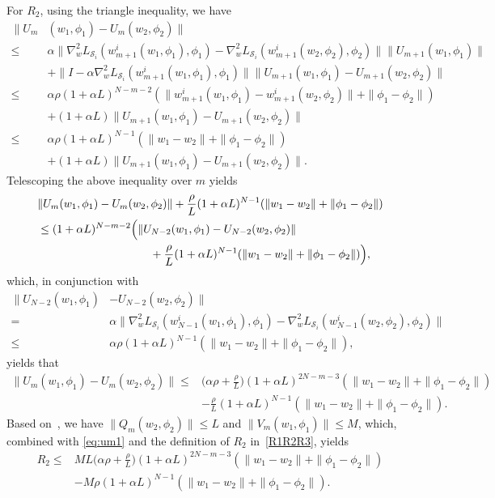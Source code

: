 \documentclass{osudissert96}
\begin{document}
 For $R_2$, using the triangle inequality, we have
\begin{align}\label{eq:impor}
\|U_m&(w_1,\phi_1)-U_m(w_2,\phi_2)\|  \nonumber
\\\leq& \alpha \|\nabla_w^2L_{\mathcal{S}_i}(w_{m+1}^i(w_1,\phi_1),\phi_1)-\nabla_w^2L_{\mathcal{S}_i}(w_{m+1}^i(w_2,\phi_2),\phi_2)\| \|U_{m+1}(w_1,\phi_1)\| \nonumber
\\&+ \|I-\alpha\nabla_w^2L_{\mathcal{S}_i}(w_{m+1}^i(w_1,\phi_1),\phi_1)\| \|U_{m+1}(w_1,\phi_1)-U_{m+1}(w_2,\phi_2)\| \nonumber
\\\leq&\alpha \rho (1+\alpha L)^{N-m-2}(\|w_{m+1}^i(w_1,\phi_1)-w_{m+1}^i(w_2,\phi_2)\| + \|\phi_1-\phi_2\|) \nonumber
\\&+ (1+\alpha L)\|U_{m+1}(w_1,\phi_1)-U_{m+1}(w_2,\phi_2)\| \nonumber
\\\leq&\alpha \rho (1+\alpha L)^{N-1}(\|w_1-w_2\| + \|\phi_1-\phi_2\|) \nonumber
\\&+ (1+\alpha L)\|U_{m+1}(w_1,\phi_1)-U_{m+1}(w_2,\phi_2)\|.
\end{align}
Telescoping the above inequality over $m$ yields
\begin{align*}
&\|U_m(w_1,\phi_1)-U_m(w_2,\phi_2)\| +\frac{\rho}{L} (1+\alpha L)^{N-1}(\|w_1-w_2\| + \|\phi_1-\phi_2\|)\nonumber
 \\&\leq (1+\alpha L)^{N-m-2}\Big(\|U_{N-2}(w_1,\phi_1)-U_{N-2}(w_2,\phi_2)\|
 \\&\hspace{3.5cm}+\frac{\rho}{L} (1+\alpha L)^{N-1}(\|w_1-w_2\| + \|\phi_1-\phi_2\|)\Big), \nonumber
\end{align*}
which, in conjunction with 
\begin{align*}
\|U_{N-2}(w_1,\phi_1)&-U_{N-2}(w_2,\phi_2)\|
\\=& \alpha\|\nabla_w^2L_{\mathcal{S}_i}(w_{N-1}^i(w_1,\phi_1),\phi_1)-\nabla_w^2L_{\mathcal{S}_i}(w_{N-1}^i(w_2,\phi_2),\phi_2)\| \nonumber
\\\leq& \alpha\rho (1+\alpha L)^{N-1}(\|w_1-w_2\|+\|\phi_1-\phi_2\|),
\end{align*}
yields that
\begin{align}\label{eq:um1}
\|U_m(w_1,\phi_1)-U_m(w_2,\phi_2)\| \leq& \big(\alpha \rho+\frac{\rho}{L}\big)(1+\alpha L)^{2N-m-3}(\|w_1-w_2\|+\|\phi_1-\phi_2\|) \nonumber
\\& -\frac{\rho}{L}(1+\alpha L)^{N-1} (\|w_1-w_2\|+\|\phi_1-\phi_2\|).
\end{align}
Based on~, we have $\|Q_m(w_2,\phi_2)\|\leq L$ and $\|V_m(w_1,\phi_1)\|\leq M$, which, combined with \cref{eq:um1} and the definition of $R_2$  in~\cref{R1R2R3}, yields
\begin{align}\label{R2}
R_2\leq& ML\Big(\alpha \rho+\frac{\rho}{L}\Big)(1+\alpha L)^{2N-m-3}(\|w_1-w_2\|+\|\phi_1-\phi_2\|)\nonumber
\\&-M\rho (1+\alpha L)^{N-1} (\|w_1-w_2\|+\|\phi_1-\phi_2\|).
\end{align}
\end{document}
